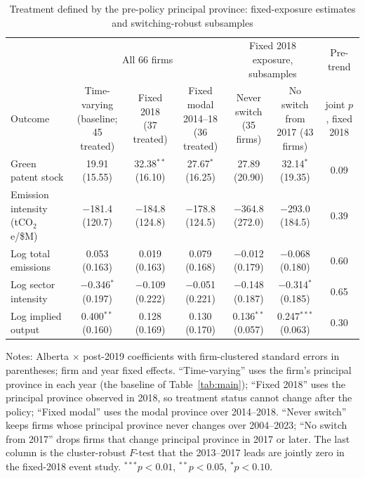 \begin{table}[htbp]\centering\small
\caption{Treatment defined by the pre-policy principal province: fixed-exposure estimates and switching-robust subsamples}
\label{tab:fixed}
\begin{adjustbox}{max width=\textwidth}
\begin{tabular}{lccccc c}
\toprule
 & \multicolumn{3}{c}{All 66 firms} & \multicolumn{2}{c}{Fixed 2018 exposure, subsamples} & Pre-trend \\
\cmidrule(lr){2-4}\cmidrule(lr){5-6}
Outcome & \makecell{Time-varying\\(baseline; 45 treated)} & \makecell{Fixed 2018\\(37 treated)} & \makecell{Fixed modal\\2014--18 (36 treated)} & \makecell{Never switch\\(35 firms)} & \makecell{No switch\\from 2017 (43 firms)} & \makecell{joint $p$,\\fixed 2018} \\
\midrule
Green patent stock & 19.91 (15.55) & 32.38$^{**}$ (16.10) & 27.67$^{*}$ (16.25) & 27.89 (20.90) & 32.14$^{*}$ (19.35) & 0.09 \\
Emission intensity (tCO$_2$e/\$M) & $-$181.4 (120.7) & $-$184.8 (124.8) & $-$178.8 (124.5) & $-$364.8 (272.0) & $-$293.0 (184.5) & 0.39 \\
Log total emissions & 0.053 (0.163) & 0.019 (0.163) & 0.079 (0.168) & $-$0.012 (0.179) & $-$0.068 (0.180) & 0.60 \\
Log sector intensity & $-$0.346$^{*}$ (0.197) & $-$0.109 (0.222) & $-$0.051 (0.221) & $-$0.148 (0.187) & $-$0.314$^{*}$ (0.185) & 0.65 \\
Log implied output & 0.400$^{**}$ (0.160) & 0.128 (0.169) & 0.130 (0.170) & 0.136$^{**}$ (0.057) & 0.247$^{***}$ (0.063) & 0.30 \\
\bottomrule
\end{tabular}
\end{adjustbox}
\par\vspace{3pt}\begin{minipage}{\textwidth}\footnotesize
Notes: Alberta $\times$ post-2019 coefficients with firm-clustered standard errors in parentheses; firm and year fixed effects. ``Time-varying'' uses the firm's principal province in each year (the baseline of Table~\ref{tab:main}); ``Fixed 2018'' uses the principal province observed in 2018, so treatment status cannot change after the policy; ``Fixed modal'' uses the modal province over 2014--2018. ``Never switch'' keeps firms whose principal province never changes over 2004--2023; ``No switch from 2017'' drops firms that change principal province in 2017 or later. The last column is the cluster-robust $F$-test that the 2013--2017 leads are jointly zero in the fixed-2018 event study. $^{***}p<0.01$, $^{**}p<0.05$, $^{*}p<0.10$.
\end{minipage}
\end{table}
